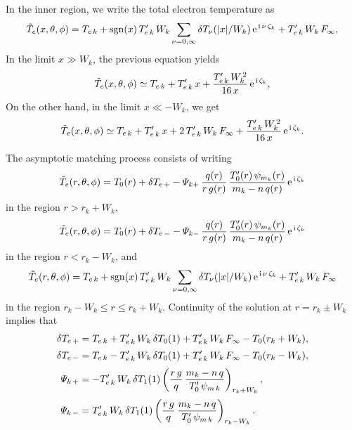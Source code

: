 \documentclass[12pt,prb,aps,notitlepage]{revtex4-1}
\begin{document}
In the inner region, we write the total electron temperature as 
\begin{equation}
\tilde{T}_e(x, \theta,\phi)=T_{e\,k} +{\rm sgn}(x)\,T_{e\,k}'\,W_k\sum_{\nu=0,\infty}\delta T_\nu(|x|/W_k)\,{\rm e}^{\,{\rm i}\,\nu\,\zeta_k}+T_{e\,k}'\,W_k\,F_\infty,
\end{equation}
In the limit $x\gg W_k$, the previous equation yields 
\begin{equation}
\tilde{T}_e(x,\theta,\phi) \simeq T_{e\,k} + T_{e\,k}'\,x + \frac{T_{e\,k}'\,W_k^{\,2}}{16\,x}\,{\rm e}^{\,{\rm i}\,\zeta_k},
\end{equation}
On the other hand, in the limit $x\ll -W_k$, we get 
\begin{equation}
\tilde{T}_e(x,\theta,\phi) \simeq T_{e\,k} + T_{e\,k}'\,x  + 2\,T_{e\,k}'\,W_k\,F_\infty + \frac{T_{e\,k}'\,W_k^{\,2}}{16\,x}\,{\rm e}^{\,{\rm i}\,\zeta_k}.
\end{equation}

The asymptotic matching process consists of writing
\begin{equation}
\tilde{T}_e(r,\theta,\phi) = T_0(r) + \delta T_{e\,+} - {\mit\Psi}_{k+}\,\frac{q(r)}{r\,g(r)}\,\frac{T_0'(r)\,\psi_{m_k}(r)}{m_k-n\,q(r)}\,{\rm e}^{\,{\rm i}\,\zeta_k}
\end{equation}
in the region $r>r_k+W_k$, 
\begin{equation}
\tilde{T}_e(r,\theta,\phi) = T_0(r) + \delta T_{e\,-} - {\mit\Psi}_{k-}\,\frac{q(r)}{r\,g(r)}\,\frac{T_0'(r)\,\psi_{m_k}(r)}{m_k-n\,q(r)}\,{\rm e}^{\,{\rm i}\,\zeta_k}
\end{equation}
in the region $r< r_k-W_k$, and 
\begin{equation}
\tilde{T}_e(r, \theta,\phi)=T_{e\,k} +{\rm sgn}(x)\,T_{e\,k}'\,W_k\sum_{\nu=0,\infty}\delta T_\nu(|x|/W_k)\,{\rm e}^{\,{\rm i}\,\nu\,\zeta_k}+T_{e\,k}'\,W_k\,F_\infty
\end{equation}
in the region $r_k-W_k \leq r\leq r_k+W_k$. Continuity of the solution at $r=r_k\pm W_k$ implies that
\begin{align}
\delta T_{e\,+} &= T_{e\,k} + T_{e\,k}'\,W_k\,\delta T_0(1)+T_{e\,k}'\,W_k\,F_\infty - T_0(r_k+W_k),\\[0.5ex]
\delta T_{e\,-} &= T_{e\,k} - T_{e\,k}'\,W_k\,\delta T_0(1) +T_{e\,k}'\,W_k\,F_\infty- T_0(r_k-W_k),\\[0.5ex]
{\mit\Psi}_{k\,+} &= - T_{e\,k}'\,W_k\,\delta T_1(1)\left(\frac{r\,g}{q}\,\frac{m_k-n\,q}{T_0'\,\psi_{m\,k}}\right)_{r_k+W_k},\\[0.5ex]
{\mit\Psi}_{k\,-} &= T_{e\,k}'\,W_k\,\delta T_1(1)\left(\frac{r\,g}{q}\,\frac{m_k-n\,q}{T_0'\,\psi_{m\,k}}\right)_{r_k-W_k}.
\end{align}
\end{document}
